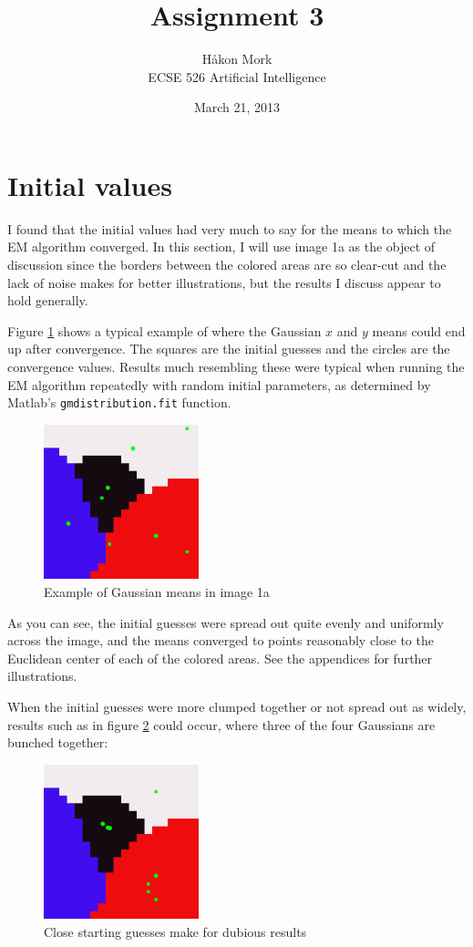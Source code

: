 \documentclass[letterpaper, 10pt, twocolumn]{article}
\title{\textbf{Assignment 3}}
\author{Håkon Mork \\ ECSE 526 Artificial Intelligence}
\date{March 21, 2013}
\numberwithin{theorem}{section}
\begin{document}
\maketitle
\noindent
\section{Initial values}
I found that the initial values had very much to say for the means to which the EM algorithm converged. 
In this section, I will use image 1a as the object of discussion since the borders between the colored areas are so clear-cut and the lack of noise makes for better illustrations, but the results I discuss appear to hold generally.

Figure \ref{fig:1a-means} shows a typical example of where the Gaussian $x$ and  $y$ means could end up after convergence. 
The squares are the initial guesses and the circles are the convergence values.
Results much resembling these were typical when running the EM  algorithm repeatedly with random initial parameters, as determined by Matlab's \texttt{gmdistribution.fit} function. 

\begin{figure}[h]
	\centering
	\includegraphics[width=0.4\textwidth]{1a-means}
	\caption{Example of Gaussian means in image 1a}
	\label{fig:1a-means}
\end{figure}
As you can see, the initial guesses were spread out quite evenly and uniformly across the image, and the means converged to points reasonably close to the Euclidean center of each of the colored areas. 
See the appendices for further illustrations.

When the initial guesses were more clumped together or not spread out as widely, results such as in figure \ref{fig:1a-closestart2} could occur, where three of the four Gaussians are bunched together:

\begin{figure}[h]
	\centering
	\includegraphics[width=0.4\textwidth]{1a-closestart2}
	\caption{Close starting guesses make for dubious results}
	\label{fig:1a-closestart2}
\end{figure}
\end{document}
